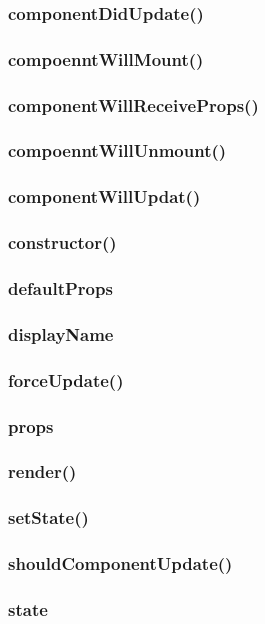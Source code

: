 \documentclass{book}
\begin{document}
\begin{CJK*}{UTF8}{gbsn}
\subsubsection{componentDidUpdate()}
\subsubsection{compoenntWillMount()}
\subsubsection{componentWillReceiveProps()}
\subsubsection{compoenntWillUnmount()}
\subsubsection{componentWillUpdat()}
\subsubsection{constructor()}
\subsubsection{defaultProps}
\subsubsection{displayName}
\subsubsection{forceUpdate()}
\subsubsection{props}
\subsubsection{render()}
\subsubsection{setState()}
\subsubsection{shouldComponentUpdate()}
\subsubsection{state}


\end{CJK*}
\end{document}

